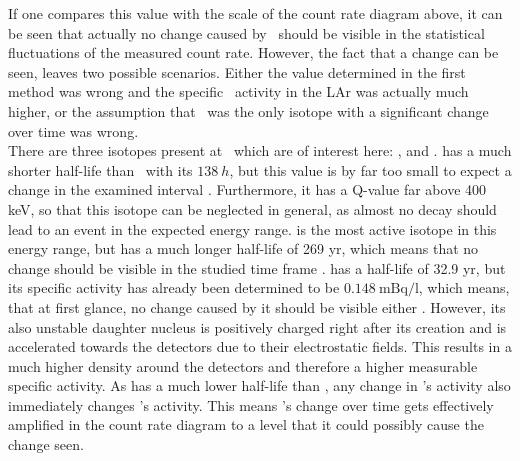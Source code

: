 \documentclass[encoding=utf8,british]{tumphthesis}
\begin{document}
If one compares this value with the scale of the count rate diagram above, it can be seen that actually no change caused by \Kr\ should be visible in the statistical fluctuations of the measured count rate.
However, the fact that a change can be seen, leaves two possible scenarios.
Either the value determined in the first method was wrong and the specific \Kr\ activity in the LAr was actually much higher, or the assumption that \Kr\ was the only isotope with a significant change over time was wrong.
\\

There are three isotopes present at \gerda\ which are of interest here: ,  and .
 has a much shorter half-life than \Kr\ with its $138 \ \unit{h}$, but this value is by far too small to expect a change in the examined interval \cite{kondev_nuclear_2008}. 
Furthermore, it has a Q-value far above 400 keV, so that this isotope can be neglected in general, as almost no decay should lead to an event in the expected energy range. 
 is the most active isotope in this energy range, but has a much longer half-life of 269 yr, which means that no change should be visible in the studied time frame \cite{singh_nuclear_2014}.
 has a half-life of 32.9 yr, but its specific activity has already been determined to be $0.148 \ \mathrm{mBq/l}$, which means, that at first glance, no change caused by it should be visible either \cite{chen_nuclear_2016}.
However, its also unstable daughter nucleus  is positively charged right after its creation and is accelerated towards the detectors due to their electrostatic fields.
This results in a much higher  density around the detectors and therefore a higher measurable specific activity.
As  has a much lower half-life than , any change in 's activity also immediately changes 's activity.
This means 's change over time gets effectively amplified in the count rate diagram to a level that it could possibly cause the change seen.
\\
\end{document}
